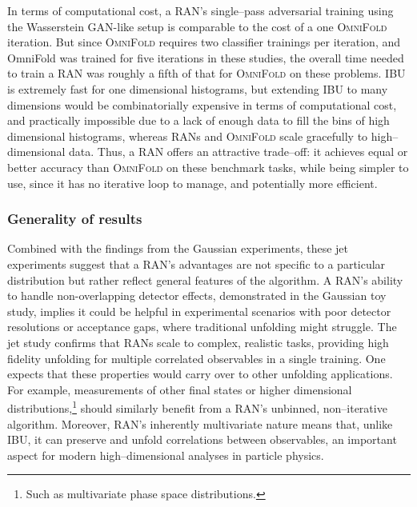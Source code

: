 {{            %
            In terms of computational cost, a RAN’s single--pass adversarial training using the Wasserstein GAN-like setup is comparable to the cost of a one \textsc{OmniFold} iteration.
            But since \textsc{OmniFold} requires two classifier trainings per iteration, and OmniFold was trained for five iterations in these studies, the overall time needed to train a RAN was roughly a fifth of that for \textsc{OmniFold} on these problems.
            IBU is extremely fast for one dimensional histograms, but extending IBU to many dimensions would be combinatorially expensive in terms of computational cost, and practically impossible due to a lack of enough data to fill the bins of high dimensional histograms, whereas RANs and \textsc{OmniFold} scale gracefully to high--dimensional data.
            Thus, a RAN offers an attractive trade--off: it achieves equal or better accuracy than \textsc{OmniFold} on these benchmark tasks, while being simpler to use, since it has no iterative loop to manage, and potentially more efficient.

    \subsubsection{Generality of results}
        Combined with the findings from the Gaussian experiments, these jet experiments suggest that a RAN’s advantages are not specific to a particular distribution but rather reflect general features of the algorithm.
        A RAN’s ability to handle non-overlapping detector effects, demonstrated in the Gaussian toy study, implies it could be helpful in experimental scenarios with poor detector resolutions or acceptance gaps, where traditional unfolding might struggle.
        The jet study confirms that RANs scale to complex, realistic tasks, providing high fidelity unfolding for multiple correlated observables in a single training.
        One expects that these properties would carry over to other unfolding applications.
        For example, measurements of other final states or higher dimensional distributions,\footnote{Such as multivariate phase space distributions.} should similarly benefit from a RAN’s unbinned, non--iterative algorithm.
        Moreover, RAN’s inherently multivariate nature means that, unlike IBU, it can preserve and unfold correlations between observables, an important aspect for modern high--dimensional analyses in particle physics.
        
}}
